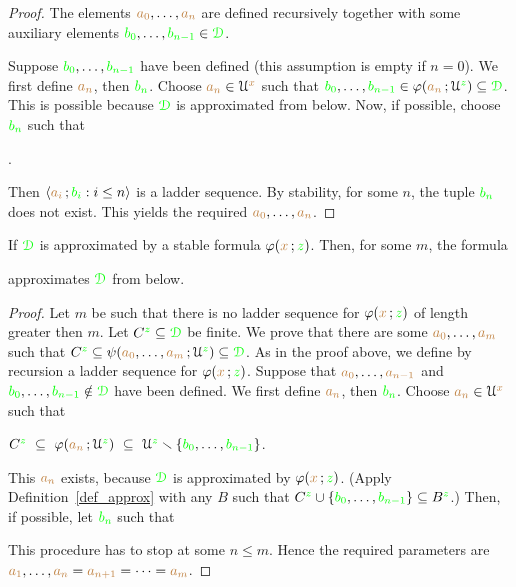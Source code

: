 \begin{proof}
The elements ${\color{brown} a_0},\dots,{\color{brown} a_n}$ are defined recursively together with some auxiliary elements ${\color{green} b_0},\dots,{\color{green} b_{n-1}}\in{\color{green}\EuScript D}$.

Suppose ${\color{green} b_0},\dots,{\color{green} b_{n-1}}$ have been defined (this assumption is empty if $n=0$).
We first define ${\color{brown} a_n}$, then ${\color{green} b_n}$. 
Choose ${\color{brown} a_n}\in\EuScript U^{\color{brown} x}$ such that ${\color{green} b_0},\dots,{\color{green} b_{n-1}}\in\varphi({\color{brown} a_n}\,;\EuScript U^{\color{green} z})\subseteq{\color{green}\EuScript D}$.
This is possible because ${\color{green}\EuScript D}$ is approximated from below.
Now, if possible, choose ${\color{green} b_n}$ such that

.

Then $\langle{\color{brown}a_i}\,;{\color{green} b_i} : i\le n\rangle$ is a ladder sequence. 
By stability, for some $n$, the tuple ${\color{green} b_n}$ does not exist.
This yields the required ${\color{brown} a_0},\dots,{\color{brown} a_n}$.
\end{proof}

\begin{lemma}\label{lem_stab_approx_below}
If ${\color{green}\EuScript D}$ is approximated by a stable formula $\varphi({\color{brown} x}\,;{\color{green} z})$.
Then, for some $m$, the formula 


approximates ${\color{green}\EuScript D}$ from below.
\end{lemma}

\begin{proof}
Let $m$ be such that there is no ladder sequence for $\varphi({\color{brown} x}\,;{\color{green} z})$ of length greater then $m$.
Let $C^{\color{green} z}\subseteq{\color{green}\EuScript D}$ be finite.
We prove that there are some ${\color{brown} a_0},\dots,{\color{brown} a_m}$ such that $C^{\color{green} z}\subseteq\psi({\color{brown} a_0},\dots,{\color{brown} a_m}\,;\EuScript U^{\color{green} z})\subseteq{\color{green}\EuScript D}$.
As in the proof above, we define by recursion a ladder sequence for $\varphi({\color{brown} x}\,;{\color{green} z})$.
Suppose that ${\color{brown} a_0},\dots,{\color{brown} a_{n-1}}$ and ${\color{green} b_0},\dots,{\color{green} b_{n-1}}\notin{\color{green}\EuScript D}$ have been defined.
We first define ${\color{brown} a_n}$, then ${\color{green} b_n}$. 
Choose ${\color{brown} a_n}\in\EuScript U^{\color{brown} x}$ such that 

\hfil$C^{\color{green} z}\ \subseteq\ \varphi({\color{brown} a_n}\,;\EuScript U^{\color{green} z})\ \subseteq\ \EuScript U^{\color{green} z}\smallsetminus\{{\color{green} b_0},\dots,{\color{green} b_{n-1}}\}$.

This ${\color{brown} a_n}$ exists, because ${\color{green}\EuScript D}$ is approximated by $\varphi({\color{brown} x}\,;{\color{green} z})$.
(Apply Definition~\ref{def_approx} with any $B$ such that $C^{\color{green} z}\cup\{{\color{green} b_0},\dots,{\color{green} b_{n-1}}\}\subseteq B^{\color{green} z}$.)
Then, if possible, let ${\color{green} b_n}$ such that


This procedure has to stop at some $n\le m$.
Hence the required parameters are ${\color{brown} a_1},\dots,{\color{brown} a_n}={\color{brown} a_{n+1}}=\dots={\color{brown} a_{m}}$.
\end{proof}

